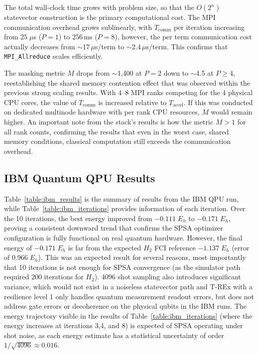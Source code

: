 The total wall-clock time grows with problem size, so that the $O(2^n)$ 
statevector construction is the primary computational cost. The MPI communication overhead grows sublinearly, with $T_{\text{comm}}$ per 
iteration increasing from $25\;\mu$s ($P=1$) to $256$\,ms ($P=8$), however, the per term communication cost actually decreases 
from $\sim$17\,$\mu$s/term to $\sim$2.4\,$\mu$s/term. This confirms that \texttt{MPI\_Allreduce} scales efficiently.

The masking metric $M$ drops from $\sim$1{,}400 at $P=2$ down to $\sim$4.5 at $P \geq 4$, reestablishing the shared memory 
contention effect that was observed within the previous strong scaling results. With 4--8 MPI ranks competing for the 4 physical CPU cores, the value of  
$T_{\text{comm}}$ is increased relative to $T_{\text{accel}}$. If this was conducted on dedicated multinode hardware with per rank CPU resources, $M$ 
would remain higher. An important note from the stack's results is how the metric $M > 1$ for all rank counts, confirming the results that even in the worst case, shared memory 
conditions, classical computation still exceeds the communication overhead.

\subsection{IBM Quantum QPU Results}
Table~\ref{table:ibm_results} is the summary of results from the IBM QPU run, while Table~\ref{table:ibm_iterations} 
provides information of each iteration. Over the 10 iterations, the best energy improved from $-0.111\;E_h$ to $-0.171\;E_h$, 
proving a consistent downward trend that confirms the SPSA optimizer configuration is fully functional on real quantum hardware. 
However, the final energy of $-0.171\;E_h$ is far from the expected $H_2$ FCI reference $-1.137\;E_h$ (error of $0.966\;E_h$). 
This was an expected result for several reasons, most importantly that 10 iterations is not enough for SPSA convergence (as the simulator path required 200 
iterations for $H_{2}$). 4096 shot sampling also introduces significant variance, which would not exist in a noiseless statevector
path and T-REx with a resilience level 1 only handles quantum measurement readout errors, but does not address gate errors or decoherence 
on the physical qubits in the IBM runs. The energy trajectory visible in the results of Table~\ref{table:ibm_iterations} 
(where the energy increases at iterations 3,4, and 8) is expected of SPSA operating under shot noise, as each energy estimate 
has a statistical uncertainty of order $1/\sqrt{4096} \approx 0.016$.    

